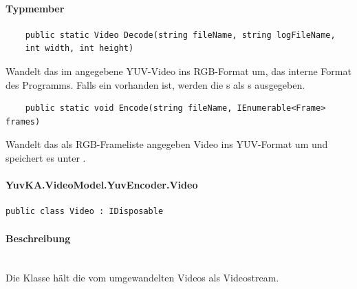 \paragraph{Typmember}
\begin{itemize}

	\begin{verbatim}
	public static Video Decode(string fileName, string logFileName,
    int width, int height)
	\end{verbatim}
	Wandelt das im  angegebene YUV-Video ins RGB-Format um, das interne Format des Programms.  Falls ein  vorhanden ist, werden die s als s ausgegeben.

	\begin{verbatim}
	public static void Encode(string fileName, IEnumerable<Frame> frames)
	\end{verbatim}
	Wandelt das als RGB-Frameliste angegeben Video ins YUV-Format um und speichert es unter . 

\end{itemize}
\setcounter{secnumdepth}{4}
\paragraph{YuvKA.VideoModel.YuvEncoder.Video}
\setcounter{secnumdepth}{3}
\begin{verbatim}
public class Video : IDisposable
\end{verbatim}

\paragraph{Beschreibung}~\\
Die Klasse  hält die vom  umgewandelten Videos als Videostream.

